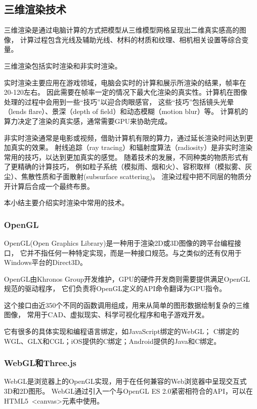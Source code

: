 \subsection{三维渲染技术}

三维渲染是通过电脑计算的方式把模型从三维模型网格呈现出二维真实感高的图像，
计算过程包含光线及辅助光线、材料的材质和纹理、相机相关设置等综合变量。

三维渲染包括实时渲染和非实时渲染。

实时渲染主要应用在游戏领域，电脑会实时的计算和展示所渲染的结果，帧率在20-120左右。
因此需要在帧率一定的情况下最大化渲染的真实性。计算机在图像处理的过程中会用到一些“技巧”以迎合肉眼感官，
这些“技巧”包括镜头光晕（lends flare）、景深（depth of field）和动态模糊（motion blur）等。
计算机的算力决定了渲染的真实感，通常需要GPU来协助完成。

非实时渲染通常是电影或视频，借助计算机有限的算力，通过延长渲染时间达到更加真实的效果。
射线追踪（ray tracing）和辐射度算法（radiosity）是非实时渲染常用的技巧，以达到更加真实的感觉。
随着技术的发展，不同种类的物质形式有了更精确的计算技巧，
例如粒子系统（模拟雨、烟和火）、容积取样（模拟雾、灰尘）、焦散性质和子面散射(subsurface scattering)。
渲染过程中把不同层的物质分开计算后合成一个最终布景。

本小结主要介绍实时渲染中常用的技术。

\subsubsection{OpenGL}

OpenGL(Open Graphics Library)是一种用于渲染2D或3D图像的跨平台编程接口，
它并不指任何一种特定实现，而是一种接口规范。与之类似的还有仅用于Windows平台的Direct3D。

OpenGL由Khronos Group开发维护，GPU的硬件开发商则需要提供满足OpenGL规范的驱动程序，
它们负责将OpenGL定义的API命令翻译为GPU指令。

这个接口由近350个不同的函数调用组成，用来从简单的图形数据绘制复杂的三维图像，
常用于CAD、虚拟现实、科学可视化程序和电子游戏开发。 

它有很多的具体实现和编程语言绑定，如JavaScript绑定的WebGL；
C绑定的WGL、GLX和CGL；iOS提供的C绑定；Android提供的Java和C绑定。

\subsubsection{WebGL和Three.js}

WebGL是浏览器上的OpenGL实现，用于在任何兼容的Web浏览器中呈现交互式3D和2D图形。
WebGL通过引入一个与OpenGL ES 2.0紧密相符合的API，可以在HTML5 <canvas>元素中使用。

